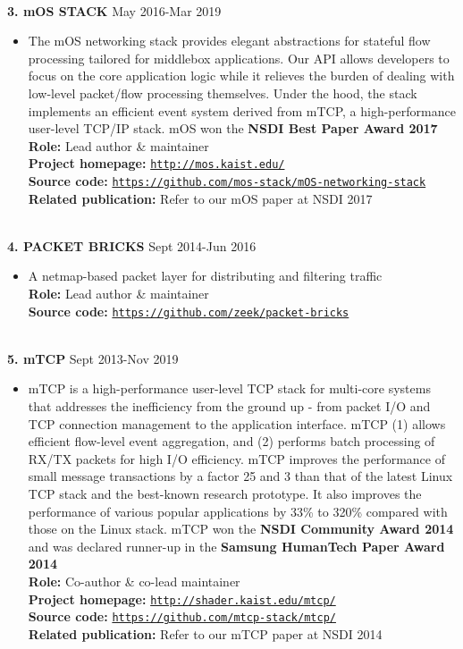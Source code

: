 \documentclass[10pt]{article}
\newenvironment{outerlist}[1][\enskip\textbullet]%
        {\begin{itemize}[#1]}{\end{itemize}%
         \vspace{-.6\baselineskip}}
\begin{document}
\ \\
{\textbf{3. m{OS} S{\footnotesize TACK}}} \hfill {May 2016-Mar 2019}
\begin{outerlist}
\item[] {The mOS networking stack provides elegant abstractions for stateful flow processing tailored for middlebox applications. Our API allows developers to focus on the core application logic while it relieves the burden of dealing with low-level packet/flow processing themselves. Under the hood, the stack implements an efficient event system derived from mTCP, a high-performance user-level TCP/IP stack. mOS won the {\bf NSDI Best Paper Award 2017}}\\
{\bf Role:} Lead author \& maintainer \\
{\bf Project homepage:} \href{http://mos.kaist.edu/}{\texttt{http://mos.kaist.edu/}} \\
{\bf Source code:} \href{https://github.com/mos-stack/mOS-networking-stack}{\texttt{https://github.com/mos-stack/mOS-networking-stack}} \\
{\bf Related publication:} Refer to our mOS paper at NSDI 2017
\end{outerlist} 
\ \\
{\textbf{4. P{\footnotesize ACKET} B{\footnotesize RICKS}}}
        \hfill {Sept 2014-Jun 2016}
\begin{outerlist}
\item[] {A netmap-based packet layer for distributing and filtering traffic}\\
{\bf Role:} Lead author \& maintainer \\
{\bf Source code:} \href{https://github.com/zeek/packet-bricks}{\texttt{https://github.com/zeek/packet-bricks}} \\
\end{outerlist} 
\ \\
{\textbf{5. m{TCP}}}  \hfill {Sept 2013-Nov 2019}
\begin{outerlist}
\item[] {mTCP is a high-performance user-level TCP stack for multi-core systems that addresses the inefficiency from the ground up - from packet I/O and TCP connection management to the application interface. mTCP (1) allows efficient flow-level event aggregation, and (2) performs batch processing of RX/TX packets for high I/O efficiency. mTCP improves the performance of small message transactions by a factor 25 and 3 than that of the latest Linux TCP stack and the best-known research prototype. It also improves the performance of various popular applications by 33\% to 320\% compared with those on the Linux stack. mTCP won the {\bf NSDI Community Award 2014} and was declared runner-up in the {\bf Samsung HumanTech Paper Award 2014}}\\
{\bf Role:} Co-author \& co-lead maintainer \\
{\bf Project homepage:} \href{http://shader.kaist.edu/mtcp/}{\texttt{http://shader.kaist.edu/mtcp/}} \\
{\bf Source code:} \href{https://github.com/mtcp-stack/mtcp/}{\texttt{https://github.com/mtcp-stack/mtcp/}} \\
{\bf Related publication:} Refer to our mTCP paper at NSDI 2014
\end{outerlist}
\end{document}
